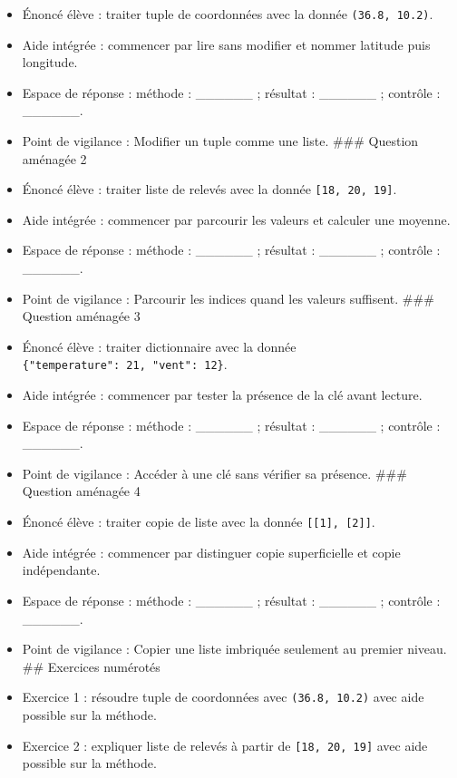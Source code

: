 \begin{itemize}
\tightlist
\item
  Énoncé élève : traiter tuple de coordonnées avec la donnée
  \texttt{(36.8,\ 10.2)}.
\item
  Aide intégrée : commencer par lire sans modifier et nommer latitude
  puis longitude.
\item
  Espace de réponse : méthode : \_\_\_\_\_\_ ; résultat : \_\_\_\_\_\_ ;
  contrôle : \_\_\_\_\_\_.
\item
  Point de vigilance : Modifier un tuple comme une liste. \#\#\#
  Question aménagée 2
\item
  Énoncé élève : traiter liste de relevés avec la donnée
  \texttt{{[}18,\ 20,\ 19{]}}.
\item
  Aide intégrée : commencer par parcourir les valeurs et calculer une
  moyenne.
\item
  Espace de réponse : méthode : \_\_\_\_\_\_ ; résultat : \_\_\_\_\_\_ ;
  contrôle : \_\_\_\_\_\_.
\item
  Point de vigilance : Parcourir les indices quand les valeurs
  suffisent. \#\#\# Question aménagée 3
\item
  Énoncé élève : traiter dictionnaire avec la donnée
  \texttt{\{"temperature":\ 21,\ "vent":\ 12\}}.
\item
  Aide intégrée : commencer par tester la présence de la clé avant
  lecture.
\item
  Espace de réponse : méthode : \_\_\_\_\_\_ ; résultat : \_\_\_\_\_\_ ;
  contrôle : \_\_\_\_\_\_.
\item
  Point de vigilance : Accéder à une clé sans vérifier sa présence.
  \#\#\# Question aménagée 4
\item
  Énoncé élève : traiter copie de liste avec la donnée
  \texttt{{[}{[}1{]},\ {[}2{]}{]}}.
\item
  Aide intégrée : commencer par distinguer copie superficielle et copie
  indépendante.
\item
  Espace de réponse : méthode : \_\_\_\_\_\_ ; résultat : \_\_\_\_\_\_ ;
  contrôle : \_\_\_\_\_\_.
\item
  Point de vigilance : Copier une liste imbriquée seulement au premier
  niveau. \#\# Exercices numérotés
\item
  Exercice 1 : résoudre tuple de coordonnées avec \texttt{(36.8,\ 10.2)}
  avec aide possible sur la méthode.
\item
  Exercice 2 : expliquer liste de relevés à partir de
  \texttt{{[}18,\ 20,\ 19{]}} avec aide possible sur la méthode.

\end{itemize}
